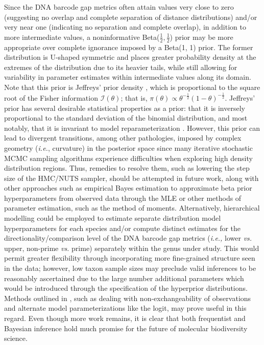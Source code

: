 \documentclass[12pt]{article}
\begin{document}
Since the DNA barcode gap metrics often attain values very close to zero (suggesting no overlap and complete separation of distance distributions) and/or very near one (indicating no separation and complete overlap), in addition to more intermediate values, a noninformative Beta($\frac{1}{2}, \frac{1}{2}$) prior may be more appropriate over complete ignorance imposed by a Beta(1, 1) prior. The former distribution is U-shaped symmetric and places greater probability density at the extremes of the distribution due to its heavier tails, while still allowing for variability in parameter estimates within intermediate values along its domain. Note that this prior is Jeffreys' prior density \citep{jeffreys1946invariant}, which is  proportional to the square root of the Fisher information $\mathcal{I}(\theta)$; that is,
$\pi(\theta) \propto \theta^{-\frac{1}{2}}(1-\theta)^{-\frac{1}{2}}$. Jeffreys' prior has several desirable statistical  properties as a prior: that it is inversely proportional to the standard deviation of the binomial distribution, and most notably, that it is invariant to model reparameterization \citep{gelman2014bayesian}. However, this prior can lead to divergent transitions, among other pathologies, imposed by complex geometry (\textit{i.e.}, curvature) in the posterior space since many iterative stochastic MCMC sampling algorithms experience difficulties when exploring high density distribution regions. Thus, remedies to resolve them, such as lowering the step size of the HMC/NUTS sampler, should be attempted in future work, along with other approaches such as empirical Bayes estimation to approximate beta prior hyperparameters from observed data through the MLE or other methods of parameter estimation, such as the method of moments. Alternatively, hierarchical modelling could be employed to estimate separate distribution model hyperparameters for each species and/or compute distinct estimates for the directionality/comparison level of the DNA barcode gap metrics (\textit{i.e.,} lower \textit{vs.} upper, non-prime \textit{vs.} prime) separately within the genus under study. This would permit greater flexibility through incorporating more fine-grained structure seen in the data; however, low taxon sample sizes may preclude valid inferences to be reasonably ascertained due to the large number additional parameters which would be introduced through the specification of the hyperprior distributions. Methods outlined in \citet{gelman2014bayesian}, such as dealing with non-exchangeability of observations and alternate model parameterizations like the logit, may prove useful in this regard.  Even though more work remains, it is clear that both frequentist and Bayesian inference hold much promise for the future of molecular biodiversity science.
\end{document}
